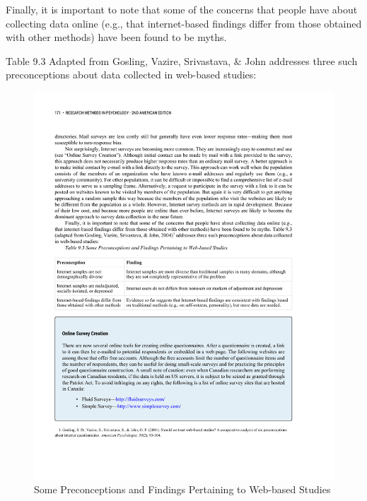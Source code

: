Finally, it is important to note that some of the concerns that people have about collecting data online (e.g., that internet-based findings differ from those obtained with other methods) have been found to be myths. 

Table 9.3 Adapted from Gosling, Vazire, Srivastava, \& John \citeyear{gosling_should_2004} addresses three such preconceptions about data collected in web-based studies:




\begin{figure}




\includegraphics[width=\linewidth]{figures/C9online.pdf}




\caption{Some Preconceptions and Findings Pertaining to Web-based Studies
  }




\label{fig:online}




\end{figure}

